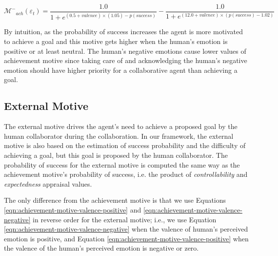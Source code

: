 \documentclass[12pt]{report}
\begin{document}
\begin{equation}
\mathcal{M^{-}}_{ach}(\varepsilon_t)=
\frac{1.0}{1+e^{(0.5+valence)\times(1.05)-p(success)}}
- \frac{1.0}{1+e^{(12.0+valence)\times(p(success)-1.02)}}
\label{eqn:achievement-motive-valence-negative}
\end{equation}

By intuition, as the probability of success increases the agent is more
motivated to achieve a goal and this motive gets higher when the human's
emotion is positive or at least neutral. The human's negative emotions cause
lower values of achievement motive since taking care of and acknowledging the
human's negative emotion should have higher priority for a collaborative agent
than achieving a goal.

\subsection{External Motive}
The external motive drives the agent's need to achieve a proposed goal by the
human collaborator during the collaboration. In our framework, the external
motive is also based on the estimation of success probability and the difficulty
of achieving a goal, but this goal is proposed by the human collaborator. The
probability of success for the external motive is computed the same way as the
achievement motive's probability of success, i.e. the product of
\textit{controllability} and \textit{expectedness} appraisal values.

The only difference from the achievement motive is that we use Equations
\ref{eqn:achievement-motive-valence-positive} and
\ref{eqn:achievement-motive-valence-negative} in reverse order for the external
motive; i.e., we use Equation \ref{eqn:achievement-motive-valence-negative}
when the valence of human's perceived emotion is positive, and Equation
\ref{eqn:achievement-motive-valence-positive} when the valence of the human's
perceived emotion is negative or zero.
\end{document}
